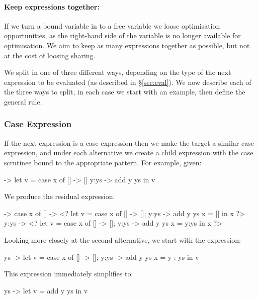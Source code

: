 \documentclass[draft]{sigplanconf}
\begin{document}
\paragraph{Keep expressions together:} If we turn a bound variable in to a free variable we loose optimisation opportunities, as the right-hand side of the variable is no longer available for optimisation. We aim to keep as many expressions together as possible, but not at the cost of loosing sharing.

\smallskip
We split in one of three different ways, depending on the type of the next expression to be evaluated (as described in \S\ref{sec:eval}). We now describe each of the three ways to split, in each case we start with an example, then define the general rule.

\subsubsection{Case Expression}

If the next expression is a case expression then we make the target a similar case expression, and under each alternative we create a child expression with the case scrutinee bound to the appropriate pattern. For example, given:

\begin{code}
\x ->  let   v = case  x of
                       []    -> []
                       y:ys  -> add y ys
       in    v
\end{code}

We produce the residual expression:

\begin{code}
\x ->  case x of
       []    -> <?  let  v =  case x of [] -> []; y:ys -> add y ys
                         x =  []
                    in   x ?>
       y:ys  -> <?  let  v =  case x of [] -> []; y:ys -> add y ys
                         x =  y:ys
                    in   x ?>
\end{code}

Looking more closely at the second alternative, we start with the expression:

\begin{code}
\y ys ->  let  v  = case x of [] -> []; y:ys -> add y ys
               x  = y : ys
          in   v
\end{code}

This expression immediately simplifies to:

\begin{code}
\y ys ->  let  v = add y ys
          in   v
\end{code}
\end{document}
